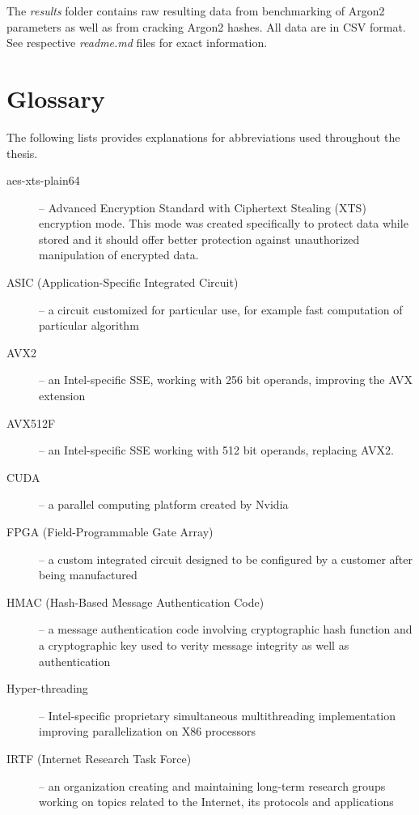 \documentclass[nolof,digital]{fithesis3}
\begin{document}
The \emph{results} folder contains raw resulting data from benchmarking of Argon2 parameters as well as from cracking Argon2 hashes. All data are in CSV format. See respective \emph{readme.md} files for exact information.

\chapter{Glossary}
The following lists provides explanations for abbreviations used throughout the thesis.

\begin{description}
\item[aes-xts-plain64] -- Advanced Encryption Standard with Ciphertext Stealing (XTS) encryption mode. This mode was created specifically to protect data while stored and it should offer better protection against unauthorized manipulation of encrypted data.

\item[ASIC (Application-Specific Integrated Circuit)] -- a circuit customized for particular use, for example fast computation of particular algorithm

\item[AVX2] -- an Intel-specific SSE, working with 256 bit operands, improving the AVX extension

\item[AVX512F] -- an Intel-specific SSE working with 512 bit operands, replacing AVX2. 

\item[CUDA] -- a parallel computing platform created by Nvidia

\item[FPGA (Field-Programmable Gate Array)] -- a custom integrated circuit designed to be configured by a customer after being manufactured

\item[HMAC (Hash-Based Message Authentication Code)] -- a message authentication code involving cryptographic hash function and a cryptographic key used to verity message integrity as well as authentication

\item[Hyper-threading] -- Intel-specific proprietary simultaneous multithreading implementation improving parallelization on X86 processors

\item[IRTF (Internet Research Task Force)] -- an organization creating and maintaining long-term research groups working on topics related to the Internet, its protocols and applications


\end{description}
\end{document}
